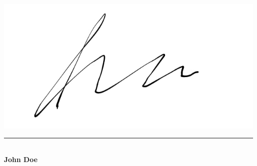 \documentclass[letterpaper,10pt]{article}
\begin{document}
\vspace{20pt}

\begin{flushleft}
  \includegraphics[scale=0.5]{sign.png} \\[4pt] %
  \vspace{10pt}
  \rule{5cm}{0.4pt} \\[-2pt]
  \textbf{John Doe}
\end{flushleft}


\end{document}
